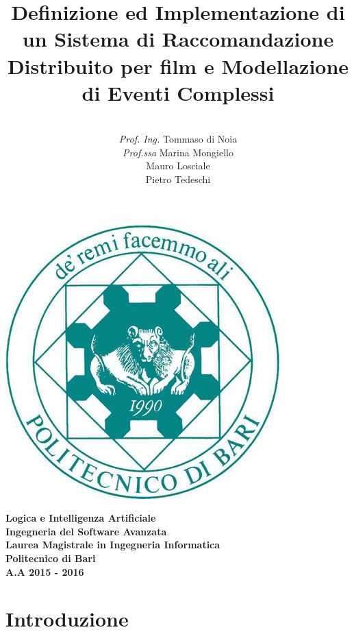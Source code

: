 \documentclass[12pt]{article}
\date{}
\begin{document}
\title{\textbf{Definizione ed Implementazione di un Sistema di Raccomandazione Distribuito per film
		e Modellazione di Eventi Complessi}}

\author{\\\textit{Prof. Ing.} Tommaso di Noia\\\textit{Prof.ssa} Marina Mongiello \\
	Mauro Losciale\\ 
	Pietro Tedeschi\\}

\clearpage\maketitle
\thispagestyle{empty}

\begin{center}
	\includegraphics[scale=0.40]{images/poliba.jpg}
\end{center}

{\textbf{\center Logica e Intelligenza Artificiale\\Ingegneria del Software Avanzata\\ Laurea Magistrale in Ingegneria Informatica\\Politecnico di Bari\\A.A 2015 - 2016\\}}

\newpage
\clearpage
\thispagestyle{empty}
\renewcommand\contentsname{Indice}
\tableofcontents
\newpage
\setcounter{page}{1}

\newpage
\section{Introduzione}
\end{document}
